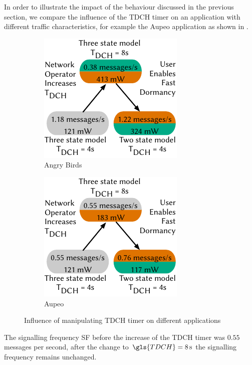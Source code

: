 In order to illustrate the impact of the behaviour discussed in the previous section, we compare the influence of the \gls{TDCH} timer on an application with different traffic characteristics, for example the Aupeo application as shown in .
\begin{figure}
	\begin{subfigure}[b]{.5\textwidth}
	\centering
	\includegraphics{network/network_traces/numerical_results/figures/consequences_angry_birds}
	\caption{Angry Birds}\label{fig:network:network_traces:numerical_results:consequences:angry_birds}
	\end{subfigure} 
	\begin{subfigure}[b]{.5\textwidth}
	\centering
	\includegraphics{network/network_traces/numerical_results/figures/consequences_aupeo}
	\caption{Aupeo}\label{fig:network:network_traces:numerical_results:consequences:aupeo}
	\end{subfigure}

	\caption{Influence of manipulating \gls{TDCH} timer on different applications}\label{fig:network:network_traces:numerical_results:consequences}
\end{figure}
The signalling frequency \gls{SF} before the increase of the \gls{TDCH} timer was \(0.55\) messages per second, after the change to \(\gls{TDCH} = \SI{8}{\second}\) the signalling frequency remains unchanged.
